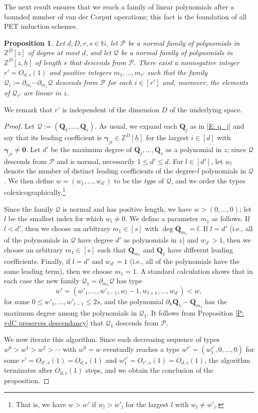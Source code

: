\documentclass[11pt]{amsart}
\newtheorem{proposition}[lemma]{Proposition}
\theoremstyle{definition}
\newcommand{\N}{{\mathbb N}}
\newcommand{\Z}{{\mathbb Z}}
\newcommand{\CP}{{\mathcal P}}
\newcommand{\CQ}{{\mathcal Q}}
\newcommand{\bq}{{\mathbf{Q}}}
\newcommand{\q}{{\mathbf{Q}}}
\newcommand{\bgamma}{{\boldsymbol{\gamma}}}
\newcommand{\uh}{{\underline{h}}}
\begin{document}
    
    The next result ensures that we reach a family of linear polynomials after a bounded number of van der Corput operations; this fact is the foundation of all PET induction schemes. 
    \begin{proposition}\label{P: vdC terminates}
        Let $d, D, r, s\in\N$, let $\CP$ be a normal family of  polynomials in $\Z^D[z]$ of degree at most $d$, and let $\CQ$ be a normal family of polynomials in $\Z^D[z, \uh]$ of length $s$ that descends from $\CP$. There exist a nonnegative integer $r'=O_{d,s}(1)$ and positive integers $m_1, \ldots, m_{r'}$ such that the family $\CQ_i := \partial_{m_i}\cdots\partial_{m_1}\CQ$ descends from $\CP$ for each $i\in[r']$ and, moreover, the elements of $\CQ_{r'}$ are linear in $z$.
    \end{proposition}
    We remark that $r'$ is independent of the dimension $D$ of the underlying space.
    \begin{proof}
        Let $\CQ:=(\q_1, \ldots, \q_s)$. As usual, we expand each $\q_j$ as in \eqref{E: q_j} and say that its leading coefficient is $\bgamma_{ji}\in\Z^D[\uh]$ for the largest $i\in[d]$ with $\bgamma_{ji}\neq\mathbf{0}$. Let $d'$ be the maximum degree of $\bq_j, \ldots, \bq_s$ as a polynomial in $z$; since $\CQ$ descends from $\CP$ and is normal, necessarily $1\leq d'\leq d$.  For $l\in[d']$, let $w_l$ denote the number of distinct leading coefficients of the {degree-$l$} polynomials  in $\CQ$. We then define $w=(w_1, \ldots, w_{d'})$ to be the \textit{type} of $\CQ$, and we order the types colexicographically.\footnote{That is, we have $w>w'$ if $w_l>w'_l$ for the largest $l$ with $w_l \neq w'_l$.} 
        
        Since the family $\CQ$ is normal and has positive length, we have $w > (0, \ldots, 0)$; let $l$ be the smallest index for which $w_l\neq 0$. We define a parameter $m_1$ as follows.
        If $l<d'$, then we choose an arbitrary $m_1\in[s]$ with $\deg \bq_{m_1} = l$. If $l=d'$ (i.e., all of the polynomials in $\CQ$ have degree $d'$ as polynomials in $z$) and $w_{d'} > 1$, then we choose an arbitrary $m_1\in[s]$ such that $\bq_{m_1}$ and $\bq_1$ have different leading coefficients. Finally, if $l=d'$ and $w_{d'} =1$ (i.e., all of the polynomials have the same leading term),  then we choose ${m_1} = 1$. A standard calculation shows that in each case the new family $\CQ_1 = \partial_{m_1}\CQ$ has type $$w' = (w'_1, \ldots, w'_{l-1}, w_l-1, w_{l+1}, \ldots, w_{d'})<w,$$ for some $0\leq w'_1, \ldots, w'_{l-1}\leq 2s$, and the polynomial $\partial_h \bq_1 - \bq_{m_1}$ has the maximum degree among the polynomials in $\CQ_1$. It follows from Proposition \ref{P: vdC preserves descendancy} that $\CQ_1$ descends from $\CP$.
        
We now iterate this algorithm.  Since each decreasing sequence of types $w^0>w^1 > w^2 > \cdots$ with $w^0 = w$ eventually reaches a type $w^{r'} = (w^{r'}_1, 0, \ldots, 0)$ for some $r'=O_{d',s}(1)=O_{d,s}(1)$ 
and $w^{r'}_1=O_{r',s}(1)=O_{d,s}(1)$, the algorithm terminates after $O_{d,s}(1)$ steps, and we obtain the conclusion of the proposition.
\end{proof}
\end{document}
